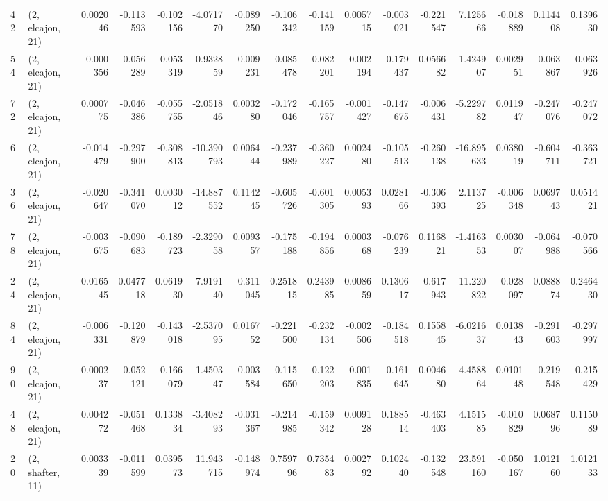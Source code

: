 \begin{tabular}{llrrrrrrrrrrrrrr}
42  &  (2, elcajon, 21) &   0.002046 & -0.113593 & -0.102156 &   -4.071770 & -0.089250 &  -0.106342 & -0.141159 &  0.005715 & -0.003021 & -0.221547 &     7.125666 & -0.018889 &  0.114408 &  0.139630 \\
54  &  (2, elcajon, 21) &  -0.000356 & -0.056289 & -0.053319 &   -0.932859 & -0.009231 &  -0.085478 & -0.082201 & -0.002194 & -0.179437 &  0.056682 &    -1.424907 &  0.002951 & -0.063867 & -0.063926 \\
72  &  (2, elcajon, 21) &   0.000775 & -0.046386 & -0.055755 &   -2.051846 &  0.003280 &  -0.172046 & -0.165757 & -0.001427 & -0.147675 & -0.006431 &    -5.229782 &  0.011947 & -0.247076 & -0.247072 \\
6   &  (2, elcajon, 21) &  -0.014479 & -0.297900 & -0.308813 &  -10.390793 &  0.006444 &  -0.237989 & -0.360227 &  0.002480 & -0.105513 & -0.260138 &   -16.895633 &  0.038019 & -0.604711 & -0.363721 \\
36  &  (2, elcajon, 21) &  -0.020647 & -0.341070 &  0.003012 &  -14.887552 &  0.114245 &  -0.605726 & -0.601305 &  0.005393 &  0.028166 & -0.306393 &     2.113725 & -0.006348 &  0.069743 &  0.051421 \\
78  &  (2, elcajon, 21) &  -0.003675 & -0.090683 & -0.189723 &   -2.329058 &  0.009357 &  -0.175188 & -0.194856 &  0.000368 & -0.076239 &  0.116821 &    -1.416353 &  0.003007 & -0.064988 & -0.070566 \\
24  &  (2, elcajon, 21) &   0.016545 &  0.047718 &  0.061930 &    7.919140 & -0.311045 &   0.251815 &  0.243985 &  0.008659 &  0.130617 & -0.617943 &    11.220822 & -0.028097 &  0.088874 &  0.246430 \\
84  &  (2, elcajon, 21) &  -0.006331 & -0.120879 & -0.143018 &   -2.537095 &  0.016752 &  -0.221500 & -0.232134 & -0.002506 & -0.184518 &  0.155845 &    -6.021637 &  0.013843 & -0.291603 & -0.297997 \\
90  &  (2, elcajon, 21) &   0.000237 & -0.052121 & -0.166079 &   -1.450347 & -0.003584 &  -0.115650 & -0.122203 & -0.001835 & -0.161645 &  0.004680 &    -4.458864 &  0.010148 & -0.219548 & -0.215429 \\
48  &  (2, elcajon, 21) &   0.004272 & -0.051468 &  0.133834 &   -3.408293 & -0.031367 &  -0.214985 & -0.159342 &  0.009128 &  0.188514 & -0.463403 &     4.151585 & -0.010829 &  0.068796 &  0.115089 \\
20  &  (2, shafter, 11) &   0.003339 & -0.011599 &  0.039573 &   11.943715 & -0.148974 &   0.759796 &  0.735483 &  0.002792 &  0.102440 & -0.132548 &    23.591160 & -0.050167 &  1.012160 &  1.012133 \\

\end{tabular}
